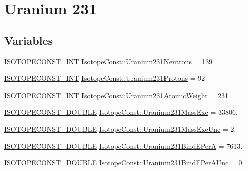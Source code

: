 \hypertarget{group___isotope_const-_uranium-_u231}{}\section{Uranium 231}
\label{group___isotope_const-_uranium-_u231}
\subsection*{Variables}
\begin{DoxyCompactItemize}
\item 
\mbox{\hyperlink{group___isotope_const-_macros_ga5f18360b3e99483a35c32d789e62621c}{I\+S\+O\+T\+O\+P\+E\+C\+O\+N\+S\+T\+\_\+\+I\+NT}} \mbox{\hyperlink{group___isotope_const-_uranium-_u231_gaea93227d9b7afbce00d8547b0f328210}{Isotope\+Const\+::\+Uranium231\+Neutrons}} = 139
\item 
\mbox{\hyperlink{group___isotope_const-_macros_ga5f18360b3e99483a35c32d789e62621c}{I\+S\+O\+T\+O\+P\+E\+C\+O\+N\+S\+T\+\_\+\+I\+NT}} \mbox{\hyperlink{group___isotope_const-_uranium-_u231_ga634f699c2d90ae517f3d6eda2232c7ce}{Isotope\+Const\+::\+Uranium231\+Protons}} = 92
\item 
\mbox{\hyperlink{group___isotope_const-_macros_ga5f18360b3e99483a35c32d789e62621c}{I\+S\+O\+T\+O\+P\+E\+C\+O\+N\+S\+T\+\_\+\+I\+NT}} \mbox{\hyperlink{group___isotope_const-_uranium-_u231_gaebe055a6631d05b739653a95ce3c3d8f}{Isotope\+Const\+::\+Uranium231\+Atomic\+Weight}} = 231
\item 
\mbox{\hyperlink{group___isotope_const-_macros_ga8f45a7272ce02c0b4c65c44636ed719a}{I\+S\+O\+T\+O\+P\+E\+C\+O\+N\+S\+T\+\_\+\+D\+O\+U\+B\+LE}} \mbox{\hyperlink{group___isotope_const-_uranium-_u231_ga7b47900cdb47d994b056c62436276da9}{Isotope\+Const\+::\+Uranium231\+Mass\+Exc}} = 33806.
\item 
\mbox{\hyperlink{group___isotope_const-_macros_ga8f45a7272ce02c0b4c65c44636ed719a}{I\+S\+O\+T\+O\+P\+E\+C\+O\+N\+S\+T\+\_\+\+D\+O\+U\+B\+LE}} \mbox{\hyperlink{group___isotope_const-_uranium-_u231_ga51edc6516dde5ace5b3c74c4db3876ce}{Isotope\+Const\+::\+Uranium231\+Mass\+Exc\+Unc}} = 2.
\item 
\mbox{\hyperlink{group___isotope_const-_macros_ga8f45a7272ce02c0b4c65c44636ed719a}{I\+S\+O\+T\+O\+P\+E\+C\+O\+N\+S\+T\+\_\+\+D\+O\+U\+B\+LE}} \mbox{\hyperlink{group___isotope_const-_uranium-_u231_gaf4b05a588b770db1b7d4d0f0516332f6}{Isotope\+Const\+::\+Uranium231\+Bind\+E\+PerA}} = 7613.
\item 
\mbox{\hyperlink{group___isotope_const-_macros_ga8f45a7272ce02c0b4c65c44636ed719a}{I\+S\+O\+T\+O\+P\+E\+C\+O\+N\+S\+T\+\_\+\+D\+O\+U\+B\+LE}} \mbox{\hyperlink{group___isotope_const-_uranium-_u231_ga211708959e1b3a29d37a47a0fbf055bd}{Isotope\+Const\+::\+Uranium231\+Bind\+E\+Per\+A\+Unc}} = 0.

\end{DoxyCompactItemize}
